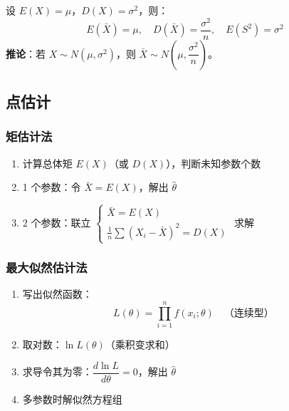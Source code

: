 \documentclass[12pt, a4paper]{article}
\begin{document}
\begin{tcolorbox}[thmbox, title={样本数字特征的性质}]
    设 $E(X)=\mu$，$D(X)=\sigma^2$，则：
    \[
        E(\bar{X})=\mu,\quad D(\bar{X})=\frac{\sigma^2}{n},\quad E(S^2)=\sigma^2
    \]
    \textbf{推论}：若 $X\sim N(\mu,\sigma^2)$，则 $\bar{X}\sim N\!\left(\mu,\dfrac{\sigma^2}{n}\right)$。
\end{tcolorbox}

\subsection{点估计}

\subsubsection{矩估计法}

\begin{tcolorbox}[thmbox, title={矩估计法步骤}]
    \begin{enumerate}
        \item 计算总体矩 $E(X)$（或 $D(X)$），判断未知参数个数
        \item 1 个参数：令 $\bar{X}=E(X)$，解出 $\hat{\theta}$
        \item 2 个参数：联立
              $\begin{cases}\bar{X}=E(X)\\\frac{1}{n}\sum(X_i-\bar{X})^2=D(X)\end{cases}$
              求解
    \end{enumerate}
\end{tcolorbox}

\subsubsection{最大似然估计法}

\begin{tcolorbox}[thmbox, title={最大似然估计步骤}]
    \begin{enumerate}
        \item 写出似然函数：
              \[
                  L(\theta) = \prod_{i=1}^n f(x_i;\theta)\quad\text{（连续型）}
              \]
        \item 取对数：$\ln L(\theta)$（乘积变求和）
        \item 求导令其为零：$\dfrac{d\ln L}{d\theta}=0$，解出 $\hat{\theta}$
        \item 多参数时解似然方程组
    \end{enumerate}
\end{tcolorbox}
\end{document}
